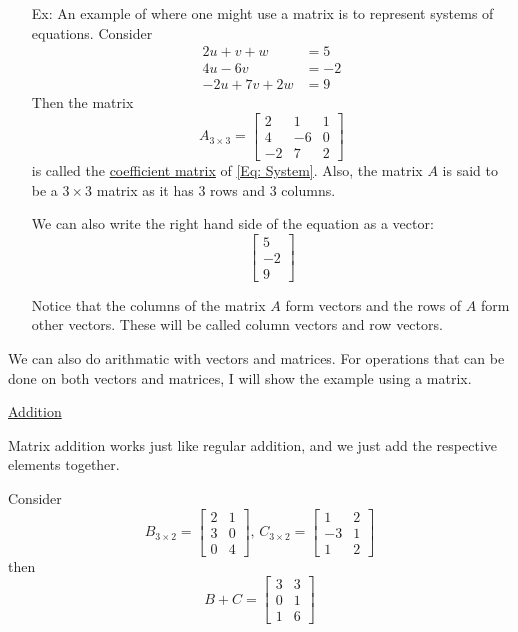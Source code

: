 \documentclass[reqno]{amsart}
\theoremstyle{definition}
\begin{document}
\begin{enumerate}

\item[Ex:  ]  An example of where one might use a matrix is to represent systems of equations.  Consider
%
\begin{equation}
\begin{split}
2u + v + w &= 5\\
4u - 6v &= -2\\
-2u + 7v + 2w &= 9
\end{split}
\label{Eq: System}
\end{equation}
%
Then the matrix
%
\begin{equation*}
A_{3\times 3} = \begin{bmatrix}
2 & 1 & 1\\
4 & -6 & 0\\
-2 & 7 & 2
\end{bmatrix}
\end{equation*}
%
is called the \underline{coefficient matrix} of \eqref{Eq: System}.  Also, the matrix $A$ is said to be
a $3\times 3$ matrix as it has $3$ rows and $3$ columns.

We can also write the right hand side of the equation as a vector:
%
\begin{equation*}
\begin{bmatrix}
5\\
-2\\
9
\end{bmatrix}
\end{equation*}

Notice that the columns of the matrix $A$ form vectors and the rows of $A$ form other vectors.  These will be called column vectors and row vectors.

\end{enumerate}


We can also do arithmatic with vectors and matrices.  For operations that can be done on both vectors and matrices, I will show the example using a matrix.

\bigskip

\underline{Addition}

Matrix addition works just like regular addition, and we just add the respective elements together.

Consider
%
\begin{equation*}
B_{3 \times 2} = \begin{bmatrix}
2 & 1\\
3 & 0\\
0 & 4
\end{bmatrix},\,
C_{3 \times 2} = \begin{bmatrix}
1 & 2\\
-3 & 1\\
1 & 2
\end{bmatrix}
\end{equation*}
%
then
%
\begin{equation*}
B + C = \begin{bmatrix}
3 & 3\\
0 & 1\\
1 & 6
\end{bmatrix}
\end{equation*}
\end{document}
